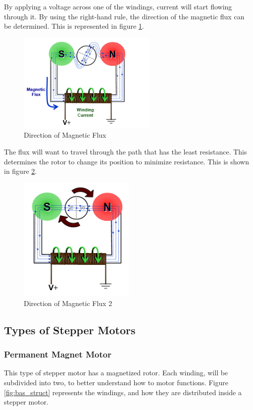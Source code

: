 By applying a voltage across one of the windings, current will start flowing through it. By using the right-hand rule, the direction of the magnetic flux can be determined. This is represented in figure \ref{fig:flux}.

\begin{figure}[ht]
	\centering
	\includegraphics[width=0.6\textwidth]{figures/move/motor3.png}
	\caption{Direction of Magnetic Flux}
	\label{fig:flux} 
\end{figure}

The flux will want to travel through the path that has the least resistance. This determines the rotor to change its position to minimize resistance. This is shown in figure \ref{fig:flux2}.

\begin{figure}[ht]
	\centering
	\includegraphics[width=0.5\textwidth]{figures/move/motor4.png}
	\caption{Direction of Magnetic Flux 2}
	\label{fig:flux2}
\end{figure}
\subsection{Types of Stepper Motors}
\subsubsection{Permanent Magnet Motor}
This type of stepper motor has a magnetized rotor. Each winding, will be subdivided into two, to better understand how to motor functions. Figure \ref{fig:bas_struct} represents the windings, and how they are distributed inside a stepper motor.

